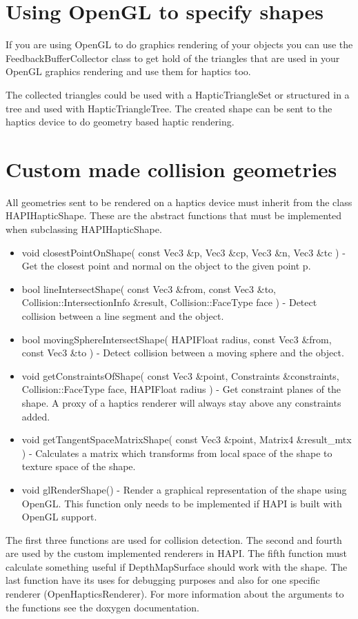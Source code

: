 \section{Using OpenGL to specify shapes}
If you are using OpenGL to do graphics rendering of your objects you
can use the FeedbackBufferCollector class to get hold of the triangles
that are used in your OpenGL graphics rendering and use them for
haptics too. 



The collected triangles could be used with a HapticTriangleSet or structured
in a tree and used with HapticTriangleTree. The created shape can be sent to
the haptics device to do geometry based haptic rendering.

\section{Custom made collision geometries}
All geometries sent to be rendered on a haptics device must
inherit from the class HAPIHapticShape. These are the abstract functions
that must be implemented when subclassing HAPIHapticShape.

\begin{itemize}
\item void closestPointOnShape( const Vec3 \&p, Vec3 \&cp, Vec3 \&n, Vec3 \&tc )
- Get the closest point and normal on the object to the given point p.
\item bool lineIntersectShape( const Vec3 \&from, const Vec3 \&to, Collision::IntersectionInfo \&result, Collision::FaceType face )
- Detect collision between a line segment and the object.
\item bool movingSphereIntersectShape( HAPIFloat radius, const Vec3 \&from, const Vec3 \&to )
- Detect collision between a moving sphere and the object.
\item void getConstraintsOfShape( const Vec3 \&point, Constraints \&constraints, Collision::FaceType face, HAPIFloat radius )
- Get constraint planes of the shape. A proxy of a haptics renderer will always stay above any constraints added.
\item void getTangentSpaceMatrixShape( const Vec3 \&point, Matrix4 \&result\_mtx )
- Calculates a matrix which transforms from local space of the shape to texture space of the shape.
\item void glRenderShape() - Render a graphical representation of the shape
using OpenGL. This function only needs to be implemented if HAPI is built with OpenGL support.
\end{itemize}

The first three functions are used for collision detection. The second and
fourth are used by the custom implemented renderers in HAPI. The fifth
function must calculate something useful if DepthMapSurface should work with
the shape. The last function have its uses for debugging purposes and also for
one specific renderer (OpenHapticsRenderer). For more information about the
arguments to the functions see the doxygen documentation.